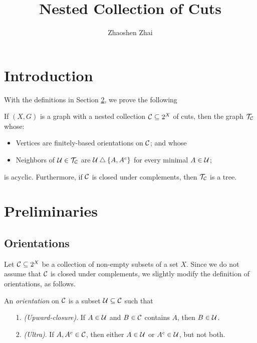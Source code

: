 \documentclass{amsart}
\begin{document}
    \title{Nested Collection of Cuts}
    \author{Zhaoshen Zhai}
    \maketitle

    \section{Introduction}

    With the definitions in Section \ref{prelim}, we prove the following
    \begin{theorem}
        If $(X,G)$ is a graph with a nested collection $\mathcal{C}\subseteq2^X$ of cuts, then the graph $\mathcal{T}_{\mathcal{C}}$ whose:
        \begin{itemize}
            \item Vertices are finitely-based orientations on $\mathcal{C}$; and whose
            \item Neighbors of $\mathcal{U}\in\mathcal{T}_{\mathcal{C}}$ are $\mathcal{U}\bigtriangleup\left\{A,A^c\right\}$ for every minimal $A\in\mathcal{U}$;
        \end{itemize}
        is acyclic. Furthermore, if $\mathcal{C}$ is closed under complements, then $\mathcal{T}_{\mathcal{C}}$ is a tree.
    \end{theorem}

    \section{Preliminaries}\label{prelim}

    \subsection{Orientations}

    Let $\mathcal{C}\subseteq2^X$ be a collection of non-empty subsets of a set $X$. Since we do not assume that $\mathcal{C}$ is closed under complements, we slightly modify the definition of orientations, as follows.

    \begin{definition}
        An \textit{orientation} on $\mathcal{C}$ is a subset $\mathcal{U}\subseteq\mathcal{C}$ such that
        \begin{enumerate}
            \item[1.] \textit{(Upward-closure)}. If $A\in\mathcal{U}$ and $B\in\mathcal{C}$ contains $A$, then $B\in\mathcal{U}$.
            \item[2.] \textit{(Ultra)}. If $A,A^c\in\mathcal{C}$, then either $A\in\mathcal{U}$ or $A^c\in\mathcal{U}$, but not both.
        \end{enumerate}
    \end{definition}
\end{document}
